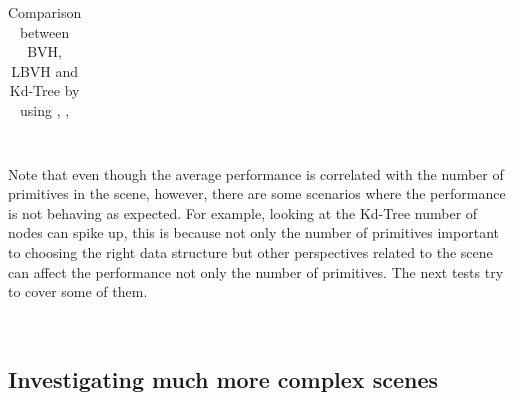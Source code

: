 \documentclass[11pt,a4paper]{article}
\begin{document}
\begin{table}[H]
{\begin{tabular}{ P{2.5cm}||P{2.5cm}P{2.5cm} P{2.5cm} P{2.5cm}  }
    \end{tabular}
}
\captionsetup{justification=centering,margin=2cm}
\caption{Comparison between BVH, LBVH and Kd-Tree by using \protect\cite{stanfordbunny}, \protect\cite{stanfordxyzdragon}, \protect\cite{buddha}}
\end{table}

\noindent
\\
Note that even though the average performance is correlated with the number of primitives in the scene, however, there are some scenarios where the performance is not behaving as expected. For example, looking at the Kd-Tree number of nodes can spike up, this is because not only the number of primitives important to choosing the right data structure but other perspectives related to the scene can affect the performance not only the number of primitives.  The next tests try to cover some of them.

\noindent
\\
\subsection{Investigating much more complex scenes}
\end{document}
